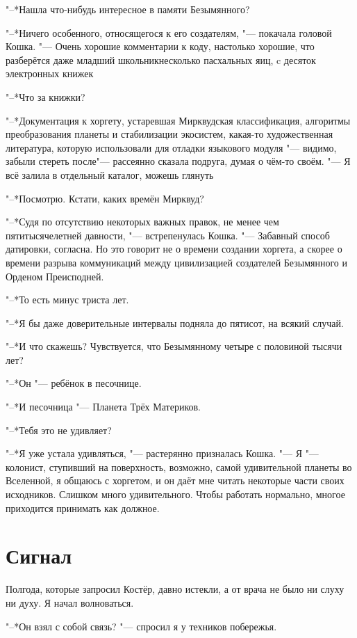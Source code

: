 "--*Нашла что-нибудь интересное в памяти Безымянного?

"--*Ничего особенного, относящегося к его создателям, "--- покачала головой Кошка.
"--- Очень хорошие комментарии к коду, настолько хорошие, что разберётся даже младший школьник\ldotst несколько пасхальных яиц, c десяток электронных книжек\ldotst

"--*Что за книжки?

"--*Документация к хоргету, устаревшая Мирквудская классификация, алгоритмы преобразования планеты и стабилизации экосистем, какая-то художественная литература, которую использовали для отладки языкового модуля "--- видимо, забыли стереть после\ldotst "--- рассеянно сказала подруга, думая о чём-то своём.
"--- Я всё залила в отдельный каталог, можешь глянуть\ldotst

"--*Посмотрю.
Кстати, каких времён Мирквуд?

"--*Судя по отсутствию некоторых важных правок, не менее чем пятитысячелетней давности, "--- встрепенулась Кошка.
"--- Забавный способ датировки, согласна.
Но это говорит не о времени создании хоргета, а скорее о времени разрыва коммуникаций между цивилизацией создателей Безымянного и Орденом Преисподней.

"--*То есть минус триста лет.

"--*Я бы даже доверительные интервалы подняла до пятисот, на всякий случай.

"--*И что скажешь?
Чувствуется, что Безымянному четыре с половиной тысячи лет?

"--*Он "--- ребёнок в песочнице.

"--*И песочница "--- Планета Трёх Материков.

"--*Тебя это не удивляет?

"--*Я уже устала удивляться, "--- растерянно призналась Кошка.
"--- Я "--- колонист, ступивший на поверхность, возможно, самой удивительной планеты во Вселенной, я общаюсь с хоргетом, и он даёт мне читать некоторые части своих исходников.
Слишком много удивительного.
Чтобы работать нормально, многое приходится принимать как должное.

\section{Сигнал}

Полгода, которые запросил Костёр, давно истекли, а от врача не было ни слуху ни духу.
Я начал волноваться.

"--*Он взял с собой связь? "--- спросил я у техников побережья.

